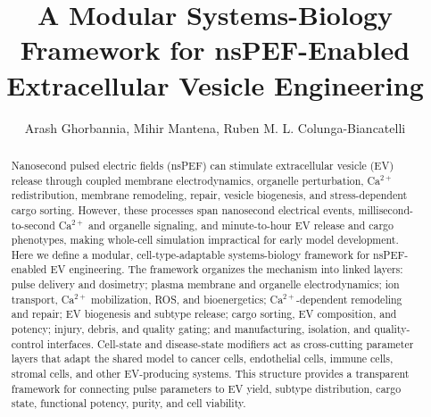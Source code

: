 \documentclass[Afour,sagev,times]{sagej}
\begin{document}

\title{A Modular Systems-Biology Framework for nsPEF-Enabled Extracellular Vesicle Engineering}

\author{Arash Ghorbannia, Mihir Mantena, Ruben M. L. Colunga-Biancatelli}



\begin{abstract}
Nanosecond pulsed electric fields (nsPEF) can stimulate extracellular vesicle (EV) release through coupled membrane electrodynamics, organelle perturbation, Ca$^{2+}$ redistribution, membrane remodeling, repair, vesicle biogenesis, and stress-dependent cargo sorting. However, these processes span nanosecond electrical events, millisecond-to-second Ca$^{2+}$ and organelle signaling, and minute-to-hour EV release and cargo phenotypes, making whole-cell simulation impractical for early model development. Here we define a modular, cell-type-adaptable systems-biology framework for nsPEF-enabled EV engineering. The framework organizes the mechanism into linked layers: pulse delivery and dosimetry; plasma membrane and organelle electrodynamics; ion transport, Ca$^{2+}$ mobilization, ROS, and bioenergetics; Ca$^{2+}$-dependent remodeling and repair; EV biogenesis and subtype release; cargo sorting, EV composition, and potency; injury, debris, and quality gating; and manufacturing, isolation, and quality-control interfaces. Cell-state and disease-state modifiers act as cross-cutting parameter layers that adapt the shared model to cancer cells, endothelial cells, immune cells, stromal cells, and other EV-producing systems. This structure provides a transparent framework for connecting pulse parameters to EV yield, subtype distribution, cargo state, functional potency, purity, and cell viability.
\end{abstract}
\end{document}

